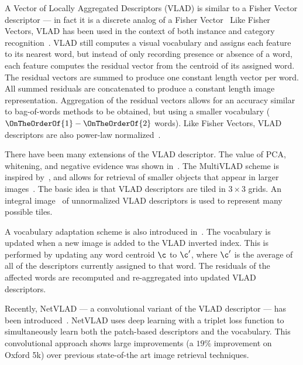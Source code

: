         A Vector of Locally Aggregated Descriptors (VLAD) is similar to a Fisher Vector descriptor --- in fact it is a
        discrete analog of a Fisher Vector~\cite{jegou_aggregating_2010, jegou_aggregating_2012} Like Fisher Vectors,
        VLAD has been used in the context of both instance and category recognition~\cite{jegou_negative_2012,
        delhumeau_revisiting_2013, arandjelovic_all_2013}. VLAD still computes a visual vocabulary and assigns each
        feature to its nearest word, but instead of only recording presence or absence of a word, each feature computes
        the residual vector from the centroid of its assigned word. The residual vectors are summed to produce one
        constant length vector per word. All summed residuals are concatenated to produce a constant length image
        representation. Aggregation of the residual vectors allows for an accuracy similar to bag-of-words methods to be
        obtained, but using a smaller vocabulary ($\OnTheOrderOf{1} - \OnTheOrderOf{2}$ words). Like Fisher Vectors,
        VLAD descriptors are also power-law normalized~\cite{jegou_aggregating_2012}.

        There have been many extensions of the VLAD descriptor. The value of PCA, whitening, and negative evidence was
        shown in~\cite{jegou_negative_2012}. The MultiVLAD scheme is inspired by~\cite{torii_visual_2011}, and allows
        for retrieval of smaller objects that appear in larger images~\cite{arandjelovic_all_2013}. The basic idea is
        that VLAD descriptors are tiled in $3 \times 3$ grids. An integral image~\cite{viola_robust_2004} of
        unnormalized VLAD descriptors is used to represent many possible tiles.

        A vocabulary adaptation scheme is also introduced in~\cite{arandjelovic_all_2013}. The vocabulary is updated
        when a new image is added to the VLAD inverted index. This is performed by updating any word centroid $\c$ to
        $\c'$, where $\c'$ is the average of all of the descriptors currently assigned to that word. The residuals of
        the affected words are recomputed and re-aggregated into updated VLAD descriptors.

        Recently, NetVLAD --- a convolutional variant of the VLAD descriptor --- has been
        introduced~\cite{arandjelovic_netvlad_2015,radenovic_cnn_2016}. NetVLAD uses deep learning with a triplet loss
        function to simultaneously learn both the patch-based descriptors and the vocabulary. This convolutional
        approach shows large improvements (a $19\percent$ improvement on Oxford 5k) over previous state-of-the art image
        retrieval techniques.

